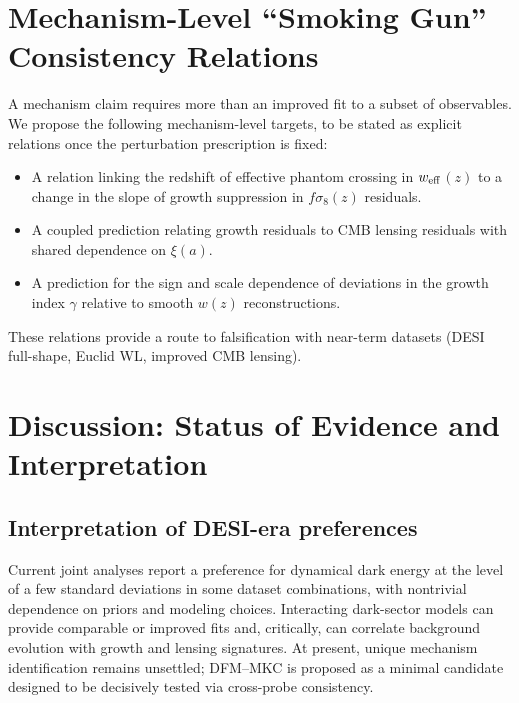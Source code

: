 \documentclass[reprint,aps,prd,nofootinbib,superscriptaddress]{revtex4-2}
\newcommand{\wz}{\ensuremath{w(z)}\xspace}
\newcommand{\weff}{\ensuremath{w_{\rm eff}}\xspace}
\begin{document}
\section{Mechanism-Level ``Smoking Gun'' Consistency Relations}
\label{sec:smokinggun}

A mechanism claim requires more than an improved fit to a subset of observables.
We propose the following mechanism-level targets, to be stated as explicit relations once the perturbation prescription is fixed:

\begin{itemize}
\item A relation linking the redshift of effective phantom crossing in \weff$(z)$ to a change in the slope of growth suppression in $f\sigma_8(z)$ residuals.
\item A coupled prediction relating growth residuals to CMB lensing residuals with shared dependence on $\xi(a)$.
\item A prediction for the sign and scale dependence of deviations in the growth index $\gamma$ relative to smooth \wz reconstructions.
\end{itemize}

These relations provide a route to falsification with near-term datasets (DESI full-shape, Euclid WL, improved CMB lensing).

\section{Discussion: Status of Evidence and Interpretation}
\label{sec:discussion}

\subsection{Interpretation of DESI-era preferences}

Current joint analyses report a preference for dynamical dark energy at the level of a few standard deviations in some dataset combinations, with nontrivial dependence on priors and modeling choices.
Interacting dark-sector models can provide comparable or improved fits and, critically, can correlate background evolution with growth and lensing signatures.
At present, unique mechanism identification remains unsettled; DFM--MKC is proposed as a minimal candidate designed to be decisively tested via cross-probe consistency.
\end{document}
